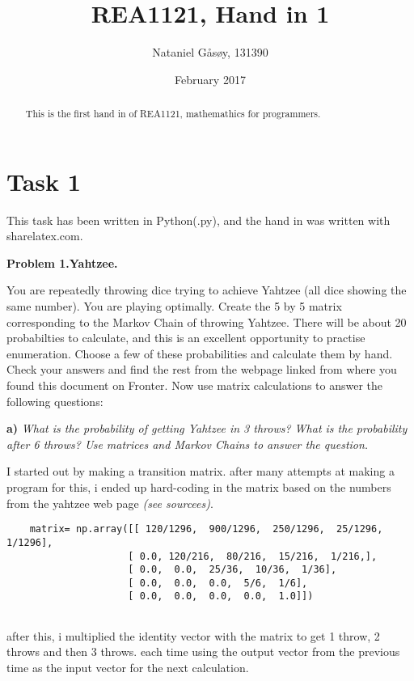 \documentclass{article}
\title{REA1121, Hand in 1}
\author{Nataniel Gåsøy, 131390}
\date{February 2017}
\begin{document}
\maketitle

\begin{abstract}
This is the first hand in of REA1121, mathemathics for programmers.
\end{abstract}

\section{Task 1}
This task has been written in Python(.py), and the hand in was written with sharelatex.com.
\vspace{10pt}

\textbf{Problem 1.Yahtzee.}

You are repeatedly throwing dice trying to achieve Yahtzee (all dice
showing the same number). You are playing optimally.
Create the 5 by 5 matrix corresponding to the Markov Chain of
throwing Yahtzee. There will be about 20 probabilties to calculate,
and this is an excellent opportunity to practise enumeration. Choose a
few of these probabilities and calculate them by hand. Check your answers
and find the rest from the webpage linked from where you found
this document on Fronter.
Now use matrix calculations to answer the following questions:
\vspace{10pt}


\textbf{a)}
\textit{What is the probability of getting Yahtzee in 3 throws? What is the
probability after 6 throws? Use matrices and Markov Chains to answer
the question.}
\vspace{10pt}

I started out by making a transition matrix. after many attempts at making a program for this, i ended up hard-coding in the matrix based on the numbers from the yahtzee web page \textit{(see sourcees)}. 

\begin{verbatim}
    matrix= np.array([[ 120/1296,  900/1296,  250/1296,  25/1296,  1/1296],
                     [ 0.0, 120/216,  80/216,  15/216,  1/216,],
                     [ 0.0,  0.0,  25/36,  10/36,  1/36],
                     [ 0.0,  0.0,  0.0,  5/6,  1/6],
                     [ 0.0,  0.0,  0.0,  0.0,  1.0]]) 
           
\end{verbatim}

after this, i multiplied the identity vector with the matrix to get 1 throw, 2 throws and then 3 throws. each time using the output vector from the previous time as the input vector for the next calculation.
\end{document}
